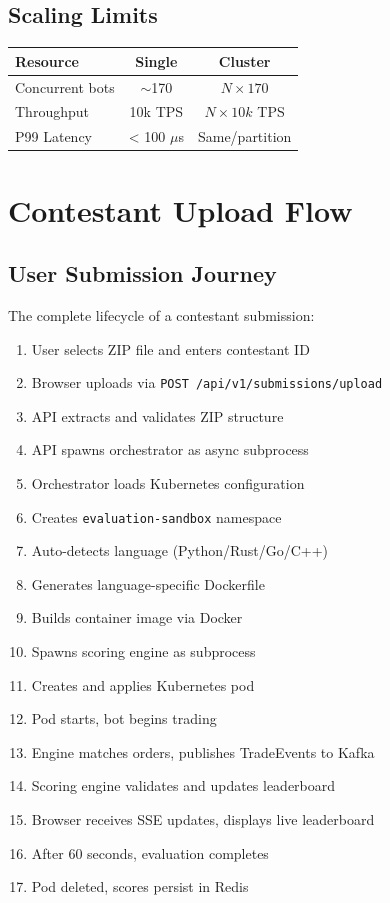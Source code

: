 \documentclass[10pt,a4paper,oneside]{report}
\begin{document}
\section{Scaling Limits}

\begin{table}[H]\small
    \centering
    \begin{tabular}{lcc}
    \toprule
    \textbf{Resource} & \textbf{Single} & \textbf{Cluster} \\
    \midrule
    Concurrent bots & $\sim$170 & $N \times 170$ \\
    Throughput & 10k TPS & $N \times 10k$ TPS \\
    P99 Latency & < 100 $\mu$s & Same/partition \\
    \bottomrule
    \end{tabular}
\end{table}

\chapter{Contestant Upload Flow}

\section{User Submission Journey}

The complete lifecycle of a contestant submission:

\begin{enumerate}
    \item User selects ZIP file and enters contestant ID
    \item Browser uploads via \texttt{POST /api/v1/submissions/upload}
    \item API extracts and validates ZIP structure
    \item API spawns orchestrator as async subprocess
    \item Orchestrator loads Kubernetes configuration
    \item Creates \texttt{evaluation-sandbox} namespace
    \item Auto-detects language (Python/Rust/Go/C++)
    \item Generates language-specific Dockerfile
    \item Builds container image via Docker
    \item Spawns scoring engine as subprocess
    \item Creates and applies Kubernetes pod
    \item Pod starts, bot begins trading
    \item Engine matches orders, publishes TradeEvents to Kafka
    \item Scoring engine validates and updates leaderboard
    \item Browser receives SSE updates, displays live leaderboard
    \item After 60 seconds, evaluation completes
    \item Pod deleted, scores persist in Redis
\end{enumerate}
\end{document}
